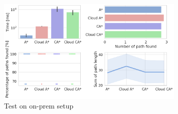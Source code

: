 \begin{figure}[H]
    \centering
    \includegraphics[width=0.8\textwidth]{docs/thesis/pictures/on_prem_test_subplot.png}
    \caption{Test on on-prem setup}
    \label{fig:onprem_test_rest}
\end{figure}